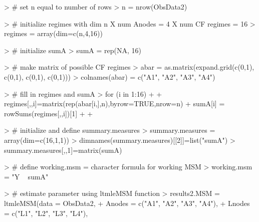 \documentclass[answers]{exam}
\begin{document}
\begin{solution}
\begin{Schunk}
\begin{Sinput}
> # set n equal to number of rows
> n = nrow(ObsData2)
\end{Sinput}
\end{Schunk}
\begin{Schunk}
\begin{Sinput}
> # initialize regimes with dim n X num Anodes = 4 X num CF regimes = 16
> regimes = array(dim=c(n,4,16)) 
\end{Sinput}
\end{Schunk}
\begin{Schunk}
\begin{Sinput}
> # initialize sumA
> sumA = rep(NA, 16)
\end{Sinput}
\end{Schunk}
\begin{Schunk}
\begin{Sinput}
> # make matrix of possible CF regimes
> abar = as.matrix(expand.grid(c(0,1), c(0,1), c(0,1), c(0,1)))
> colnames(abar) = c("A1", "A2", "A3", "A4")
\end{Sinput}
\end{Schunk}
\begin{Schunk}
\begin{Sinput}
> # fill in regimes and sumA
> for (i in 1:16){
+   
+   regimes[,,i]=matrix(rep(abar[i,],n),byrow=TRUE,nrow=n)
+   sumA[i] = rowSums(regimes[,,i])[1]
+   
+ }
\end{Sinput}
\end{Schunk}
\begin{Schunk}
\begin{Sinput}
> # initialize and define summary.measures
> summary.measures = array(dim=c(16,1,1))
> dimnames(summary.measures)[[2]]=list("sumA")
> summary.measures[,,1]=matrix(sumA)
\end{Sinput}
\end{Schunk}
\begin{Schunk}
\begin{Sinput}
> # define working.msm = character formula for working MSM
> working.msm = "Y ~ sumA"
\end{Sinput}
\end{Schunk}
\begin{Schunk}
\begin{Sinput}
> # estimate parameter using ltmleMSM function
> results2.MSM = ltmleMSM(data = ObsData2, 
+                         Anodes = c("A1", "A2", "A3", "A4"), 
+                         Lnodes = c("L1", "L2", "L3", "L4"), 

\end{Sinput}
\end{Schunk}
\end{solution}
\end{document}
